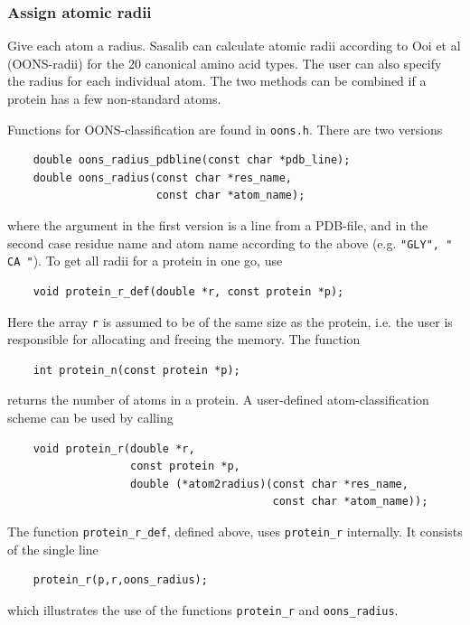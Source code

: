 \documentclass[a4paper,11pt]{article}
\begin{document}
\subsubsection{Assign atomic radii}
Give each atom a radius. Sasalib can calculate atomic radii according
to Ooi et al (OONS-radii) for the 20 canonical amino acid types. The
user can also specify the radius for each individual atom. The two
methods can be combined if a protein has a few non-standard atoms.

Functions for OONS-classification are found in \texttt{oons.h}. There
are two versions
\begin{verbatim}
    double oons_radius_pdbline(const char *pdb_line);
    double oons_radius(const char *res_name,
                       const char *atom_name);
\end{verbatim}
where the argument in the first version is a line from a PDB-file, and
in the second case residue name and atom name according to the above
(e.g. \texttt{"GLY", " CA "}). To get all radii for a protein in one
go, use
\begin{verbatim}
    void protein_r_def(double *r, const protein *p);
\end{verbatim} 
Here the array \texttt{r} is assumed to be of the same size as the
protein, i.e. the user is responsible for allocating and freeing the
memory. The function
\begin{verbatim}
    int protein_n(const protein *p);
\end{verbatim}
returns the number of atoms in a protein.  A user-defined
atom-classification scheme can be used by calling
\begin{verbatim}
    void protein_r(double *r,
                   const protein *p, 
                   double (*atom2radius)(const char *res_name, 
                                         const char *atom_name));
\end{verbatim}
The function \texttt{protein\_r\_def}, defined above, uses
\texttt{protein\_r} internally. It consists of the single line
\begin{verbatim}
    protein_r(p,r,oons_radius);
\end{verbatim}
which illustrates the use of the functions \texttt{protein\_r} and
\texttt{oons\_radius}.
\end{document}
